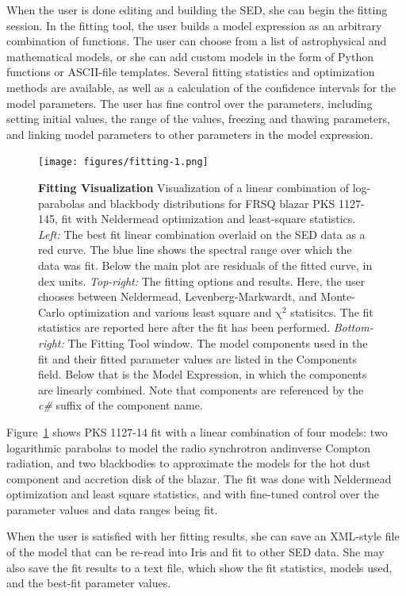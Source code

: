 \documentclass[5p]{elsarticle}
\begin{document}
When the user is done editing and building the SED, she can begin the fitting session. In the fitting tool, the user builds a model expression as an arbitrary combination of functions. The user can choose from a list of astrophysical and mathematical models, or she can add custom models in the form of Python functions or ASCII-file templates. Several fitting statistics and optimization methods are available, as well as a calculation of the confidence intervals for the model parameters. The user has fine control over the parameters, including setting initial values, the range of the values, freezing and thawing parameters, and linking model parameters to other parameters in the model expression. 

\begin{figure}
\begin{center}
\texttt{[image: figures/fitting-1.png]}
\caption{\textbf{\label{fig:fitting1} Fitting Visualization} Visualization of a linear combination of log-parabolas and blackbody distributions for FRSQ blazar PKS 1127-145, fit with Neldermead optimization and least-square statistics. \textit{Left:} The best fit linear combination overlaid on the SED data as a red curve. The blue line shows the spectral range over which the data was fit. Below the main plot are residuals of the fitted curve, in dex units. \textit{Top-right:} The fitting options and results. Here, the user chooses between Neldermead, Levenberg-Markwardt, and Monte-Carlo optimization and various least square and $\mathrm{\chi}^{2}$ statisitcs. The fit statistics are reported here after the fit has been performed. \textit{Bottom-right:} The Fitting Tool window. The model components used in the fit and their fitted parameter values are listed in the Components field. Below that is the Model Expression, in which the components are linearly combined. Note that components are referenced by the \textit{c\#} suffix of the component name.}
\end{center}
\end{figure}

Figure~\ref{fig:fitting1} shows PKS 1127-14 fit with a linear combination of four models: two logarithmic parabolas to model the radio synchrotron andinverse Compton radiation, and two blackbodies to approximate the models for the hot dust component and accretion disk of the blazar. The fit was done with Neldermead optimization and least square statistics, and with fine-tuned control over the parameter values and data ranges being fit.

When the user is satisfied with her fitting results, she can save an XML-style file of the model that can be re-read into Iris and fit to other SED data. She may also save the fit results to a text file, which show the fit statistics, models used, and the best-fit parameter values. 
\end{document}
